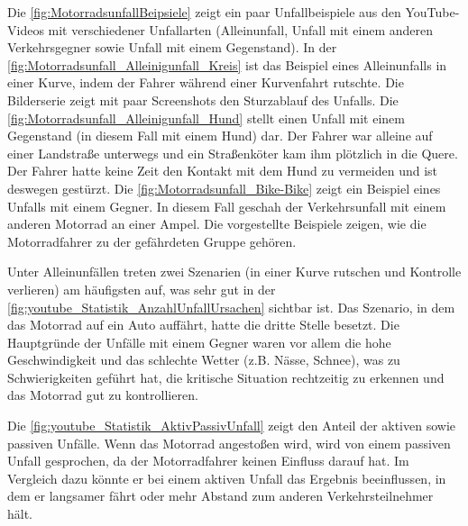 Die \autoref{fig:MotorradsunfallBeipsiele} zeigt ein paar Unfallbeispiele aus den YouTube-Videos mit verschiedener Unfallarten (Alleinunfall, Unfall mit einem anderen Verkehrsgegner sowie Unfall mit einem Gegenstand). In der \autoref{fig:Motorradsunfall_Alleinigunfall_Kreis} ist das Beispiel eines Alleinunfalls in einer Kurve, indem der Fahrer während einer Kurvenfahrt rutschte. Die Bilderserie zeigt mit paar Screenshots den Sturzablauf des Unfalls. Die \autoref{fig:Motorradsunfall_Alleinigunfall_Hund} stellt einen Unfall mit einem Gegenstand (in diesem Fall mit einem Hund) dar. Der Fahrer war alleine auf einer Landstraße unterwegs und ein Straßenköter kam ihm plötzlich in die Quere. Der Fahrer hatte keine Zeit den Kontakt mit dem Hund zu vermeiden und ist deswegen gestürzt.
Die \autoref{fig:Motorradsunfall_Bike-Bike} zeigt ein Beispiel eines Unfalls mit einem Gegner. In diesem Fall geschah der Verkehrsunfall mit einem anderen Motorrad an einer Ampel. Die vorgestellte Beispiele zeigen, wie die Motorradfahrer zu der gefährdeten Gruppe gehören.


Unter Alleinunfällen treten zwei Szenarien (in einer Kurve rutschen und Kontrolle verlieren) am häufigsten auf, was sehr gut in der \autoref{fig:youtube_Statistik_AnzahlUnfallUrsachen} sichtbar ist. Das Szenario, in dem das Motorrad auf ein Auto auffährt, hatte die dritte Stelle besetzt. Die Hauptgründe der Unfälle mit einem Gegner waren vor allem die hohe Geschwindigkeit und das schlechte Wetter (z.B. Nässe, Schnee), was zu Schwierigkeiten geführt hat, die kritische Situation rechtzeitig zu erkennen und das Motorrad gut zu kontrollieren.

Die \autoref{fig:youtube_Statistik_AktivPassivUnfall} zeigt den Anteil der aktiven sowie passiven Unfälle. Wenn das Motorrad angestoßen wird, wird von einem passiven Unfall gesprochen, da der Motorradfahrer keinen Einfluss darauf hat. Im Vergleich dazu könnte er bei einem aktiven Unfall das Ergebnis beeinflussen, in dem er langsamer fährt oder mehr Abstand zum anderen Verkehrsteilnehmer hält.

